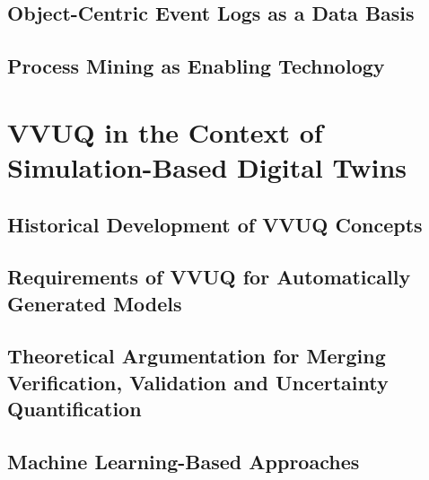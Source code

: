 \subsection{Object-Centric Event Logs as a Data Basis}
\label{sec:object-centric-event-logs}


\subsection{Process Mining as Enabling Technology}



\section{VVUQ in the Context of Simulation-Based Digital Twins}
\label{sec:vvuq-sbdt}


\subsection{Historical Development of VVUQ Concepts}

\subsection{Requirements of VVUQ for Automatically Generated Models}

\subsection{Theoretical Argumentation for Merging Verification, Validation and Uncertainty Quantification}

\subsection{Machine Learning-Based Approaches}

